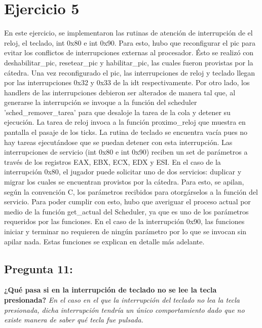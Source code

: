 \documentclass[10pt, a4paper]{article}
\begin{document}
\section{Ejercicio 5}

En este ejercicio, se implementaron las rutinas de atención de interrupción de el reloj, el teclado, int 0x80 e int 0x90. Para esto, hubo que reconfigurar el pic para evitar los conflictos de interrupciones externas al procesador. Ésto se realizó con deshabilitar\_pic, resetear\_pic y habilitar\_pic, las cuales fueron provistas por la cátedra. Una vez reconfigurado el pic, las interrupciones de reloj y teclado llegan por las interrupciones 0x32 y 0x33 de la idt respectivamente.\newline
Por otro lado, los handlers de las interrupciones debieron ser alterados de manera tal que, al generarse la interrupción se invoque a la función del scheduler 'sched\_remover\_tarea' para que desaloje la tarea de la cola y detener su ejecución. La tarea de reloj invoca a la función proximo\_reloj que muestra en pantalla el pasaje de los ticks. La rutina de teclado se encuentra vacía pues no hay tareas ejecutándose que se puedan detener con esta interrupción.\newline
Las interrupciones de servicio (int 0x80 e int 0x90) reciben un set de parámetros a través de los registros EAX, EBX, ECX, EDX y ESI. En el caso de la interrupción 0x80, el jugador puede solicitar uno de dos servicios: duplicar y migrar los cuales se encuentran provistos por la cátedra. Para esto, se apilan, según la convención C, los parámetros recibidos para otorgárselos a la función del servicio. Para poder cumplir con esto, hubo que averiguar el proceso actual por medio de la función get\_actual del Scheduler, ya que es uno de los parámetros requeridos por las funciones.\newline
En el caso de la interrupción 0x90, las funciones iniciar y terminar no requieren de ningún parámetro por lo que se invocan sin apilar nada. Estas funciones se explican en detalle más adelante.

{\subsection{Pregunta 11:}} \textbf{¿Qué pasa si en la interrupción de teclado no se lee la tecla presionada?}\newline
\newline
\textit{En el caso en el que la interrupción del teclado no lea la tecla presionada, dicha interrupción tendría un único comportamiento dado que no existe manera de saber qué tecla fue pulsada.}
\end{document}
